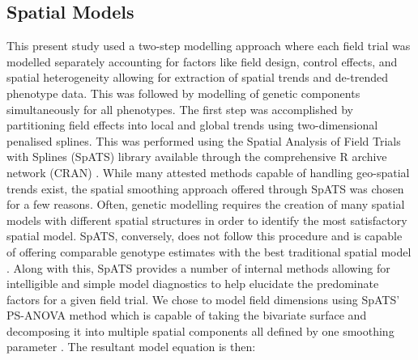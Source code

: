 \begin{table}

\caption{\label{tab:location-table}Agronomic properties of the screening trials conducted in Est and Heelsum}
\centering
{}
\end{table}

\subsection{Spatial Models}

This present study used a two-step modelling approach where each field trial was modelled separately accounting for factors like field design, control effects, and spatial heterogeneity allowing for extraction of spatial trends and de-trended phenotype data. This was followed by modelling of genetic components simultaneously for all phenotypes. The first step was accomplished by partitioning field effects into local and global trends using two-dimensional penalised splines. This was performed using the Spatial Analysis of Field Trials with Splines (SpATS) library available through the comprehensive R archive network (CRAN) \parencite{Rodriguez-Alvarez2018}. While many attested methods capable of handling geo-spatial trends exist, the spatial smoothing approach offered through SpATS was chosen for a few reasons. Often, genetic modelling requires the creation of many spatial models with different spatial structures in order to identify the most satisfactory spatial model. SpATS, conversely, does not follow this procedure and is capable of offering comparable genotype estimates with the best traditional spatial model \parencite{Velazco2017}. Along with this, SpATS provides a number of internal methods allowing for intelligible and simple model diagnostics to help elucidate the predominate factors for a given field trial. We chose to model field dimensions using SpATS' PS-ANOVA method which is capable of taking the bivariate surface and decomposing it into multiple spatial components all defined by one smoothing parameter \parencite{Lee2013}. The resultant model equation is then:

